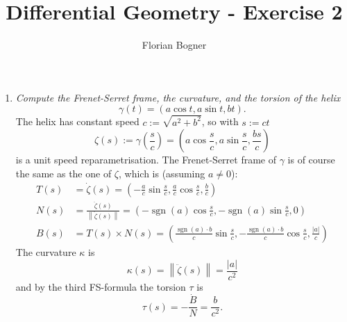 \documentclass[a4paper,11pt,notitlepage,fullpage]{article}
\DeclareMathOperator{\sgn}{sgn}
\begin{document}
\author{Florian Bogner}
\title{Differential Geometry - Exercise 2}
\maketitle
\begin{enumerate}
\item \emph{Compute the Frenet-Serret frame, the curvature, and the torsion of the helix}
\begin{equation*}
\gamma(t) = \left(a \cos t, a \sin t, bt \right) .
\end{equation*}
The helix has constant speed $c := \sqrt{a^2 + b^2}$, so with $s := ct$
\begin{equation*}
\zeta(s) := \gamma\left(\frac{s}{c}\right) = \left( a \cos\frac{s}{c}, a \sin\frac{s}{c}, \frac{bs}{c} \right)
\end{equation*}
is a unit speed reparametrisation. The Frenet-Serret frame of $\gamma$ is of course the same as the one of $\zeta$, which is (assuming $a \neq 0$):
\begin{align*}
T(s) &= \dot\zeta(s) = \left(-\frac{a}{c} \sin\frac{s}{c}, \frac{a}{c} \cos\frac{s}{c}, \frac{b}{c} \right) \\
N(s) &= \frac{\ddot\zeta(s)}{\left\| \ddot\zeta(s) \right\|} =  \left(-\sgn(a)\cos\frac{s}{c}, - \sgn(a)\sin\frac{s}{c}, 0 \right)\\
B(s) &= T(s) \times N(s) =  \left( \frac{\sgn(a)\cdot b}{c} \sin \frac{s}{c}, -\frac{\sgn(a)\cdot b}{c} \cos \frac{s}{c} , \frac{|a|}{c} \right)
\end{align*}
The curvature $\kappa$ is
\begin{equation*}
\kappa(s) = \left\| \ddot\zeta(s) \right\| = \frac{|a|}{c^2}
\end{equation*}
and by the third FS-formula the torsion $\tau$ is
\begin{equation*}
\tau(s) = - \frac{\dot B}{N} = \frac{b}{c^2}.
\end{equation*}


\end{enumerate}
\end{document}
